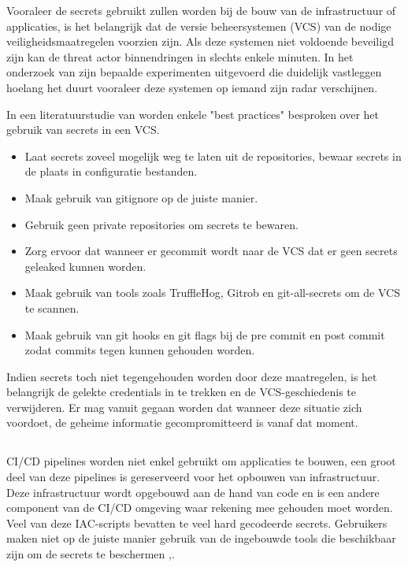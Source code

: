 Vooraleer de secrets gebruikt zullen worden bij de bouw van de infrastructuur of applicaties, is het belangrijk dat de versie beheersystemen (VCS) van de nodige veiligheidsmaatregelen voorzien zijn. Als deze systemen niet voldoende beveiligd zijn kan de threat actor binnendringen in slechts enkele minuten. In het onderzoek van \autocite{Mouw2021} zijn bepaalde experimenten uitgevoerd die duidelijk vastleggen hoelang het duurt vooraleer deze systemen op iemand zijn radar verschijnen.
\newline 

In een literatuurstudie van \textcite{Basak2023} worden enkele "best practices" besproken over het gebruik van secrets in een VCS. 

\begin{itemize}
  \item Laat secrets zoveel mogelijk weg te laten uit de repositories, bewaar secrets in de plaats in configuratie bestanden.
  \item Maak gebruik van gitignore op de juiste manier.
  \item Gebruik geen private repositories om secrets te bewaren.
  \item Zorg ervoor dat wanneer er gecommit wordt naar de VCS dat er geen secrets geleaked kunnen worden.
  \item Maak gebruik van tools zoals TruffleHog, Gitrob en git-all-secrets om de VCS te scannen.
  \item Maak gebruik van git hooks en git flags bij de pre commit en post commit zodat commits tegen kunnen gehouden worden.
\end{itemize}

Indien secrets toch niet tegengehouden worden door deze maatregelen, is het belangrijk de gelekte credentials in te trekken en de VCS-geschiedenis te verwijderen. Er mag vanuit gegaan worden dat wanneer deze situatie zich voordoet, de geheime informatie gecompromitteerd is vanaf dat moment.


\subsection{}%
\label{sec:Secrets in infrastructure as code en secrets beheer}
CI/CD pipelines worden niet enkel gebruikt om applicaties te bouwen, een groot deel van deze pipelines is gereserveerd voor het opbouwen van infrastructuur. Deze infrastructuur wordt opgebouwd aan de hand van code en is een andere component van de CI/CD omgeving waar rekening mee gehouden moet worden. Veel van deze IAC-scripts bevatten te veel hard gecodeerde secrets. Gebruikers maken niet op de juiste manier gebruik van de ingebouwde tools die beschikbaar zijn om de secrets te beschermen \autocite{Rahman2019},\autocite{Kumara2021}.
\newline

